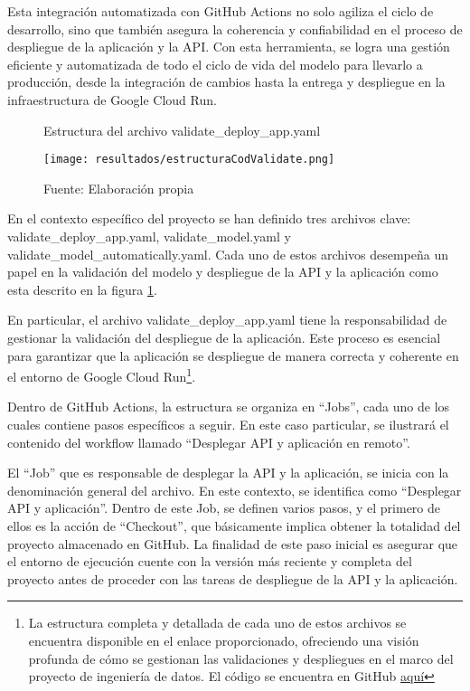 Esta integración automatizada con GitHub Actions no solo agiliza el ciclo de desarrollo, sino que también asegura la coherencia y confiabilidad en el proceso de despliegue de la aplicación y la API. Con esta herramienta, se logra una gestión eficiente y automatizada de todo el ciclo de vida del modelo para llevarlo a producción, desde la integración de cambios hasta la entrega y despliegue en la infraestructura de Google Cloud Run.


\begin{figure}[h]
	\centering
	\caption{Estructura del archivo validate\_deploy\_app.yaml}
	\texttt{[image: resultados/estructuraCodValidate.png]}
	\caption*{\footnotesize Fuente: Elaboración propia}
	\label{fig:figuraEstructuraCodValidate}
\end{figure}

\newpage

En el contexto específico del proyecto se han definido tres archivos clave: validate\_deploy\_app.yaml, validate\_model.yaml y validate\_model\_automatically.yaml. Cada uno de estos archivos desempeña un papel en la validación del modelo y despliegue de la API y la aplicación como esta descrito en la figura \ref{fig:figuraEstructuraCodValidate}. \newline

En particular, el archivo validate\_deploy\_app.yaml tiene la responsabilidad de gestionar la validación del despliegue de la aplicación. Este proceso es esencial para garantizar que la aplicación se despliegue de manera correcta y coherente en el entorno de Google Cloud Run\footnote{La estructura completa y detallada de cada uno de estos archivos se encuentra disponible en el enlace proporcionado, ofreciendo una visión profunda de cómo se gestionan las validaciones y despliegues en el marco del proyecto de ingeniería de datos. El código se encuentra en GitHub \href{https://github.com/juferoto/mlops_project/tree/master/.github/workflows}{aquí}}. \newline

Dentro de GitHub Actions, la estructura se organiza en ``Jobs'', cada uno de los cuales contiene pasos específicos a seguir. En este caso particular, se ilustrará el contenido del workflow llamado ``Desplegar API y aplicación en remoto''. \newline

El ``Job'' que es responsable de desplegar la API y la aplicación, se inicia con la denominación general del archivo. En este contexto, se identifica como ``Desplegar API y aplicación''. Dentro de este Job, se definen varios pasos, y el primero de ellos es la acción de ``Checkout'', que básicamente implica obtener la totalidad del proyecto almacenado en GitHub. La finalidad de este paso inicial es asegurar que el entorno de ejecución cuente con la versión más reciente y completa del proyecto antes de proceder con las tareas de despliegue de la API y la aplicación.

